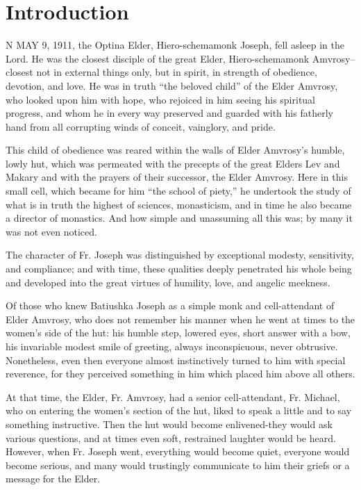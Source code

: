 \chapter*{Introduction}

N MAY 9, 1911, the Optina Elder, Hiero-schemamonk Joseph, fell asleep in the Lord. \label{intro-excerpt} He was the closest disciple of the great Elder, Hiero-schemamonk Amvrosy--closest not in external things only, but in spirit, in strength of obedience, devotion, and love. He was in truth “the beloved child” of the Elder Amvrosy, who looked upon him with hope, who rejoiced in him seeing his spiritual progress, and whom he in every way preserved and guarded with his fatherly hand from all corrupting winds of conceit, vainglory, and pride.

This child of obedience was reared within the walls of Elder Amvrosy's humble, lowly hut, which was permeated with the precepts of the great Elders Lev and Makary and with the prayers of their successor, the Elder Amvrosy. Here in this small cell, which became for him “the school of piety,” he undertook the study of what is in truth the highest of sciences, monasticism, and in time he also became a director of monastics. And how simple and unassuming all this was; by many it was not even noticed.

The character of Fr. Joseph was distinguished by exceptional modesty, sensitivity, and compliance; and with time, these qualities deeply penetrated his whole being and developed into the great virtues of humility, love, and angelic meekness.

Of those who knew Batiushka Joseph as a simple monk and cell-attendant of Elder Amvrosy, who does not remember his manner when he went at times to the women's side of the hut: his humble step, lowered eyes, short answer with a bow, his invariable modest smile of greeting, always inconspicuous, never obtrusive. Nonetheless, even then everyone almost instinctively turned to him with special reverence, for they perceived something in him which placed him above all others.

At that time, the Elder, Fr. Amvrosy, had a senior cell-attendant, Fr. Michael, who on entering the women's section of the hut, liked to speak a little and to say something instructive. Then the hut would become enlivened-they would ask various questions, and at times even soft, restrained laughter would be heard. However, when Fr. Joseph went, everything would become quiet, everyone would become serious, and many would trustingly communicate to him their griefs or a message for the Elder.